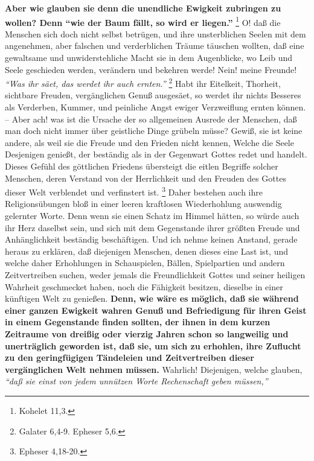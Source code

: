 \textbf{Aber wie glauben sie denn die unendliche Ewigkeit zubringen zu wollen? Denn
"`wie der Baum fällt, so wird er liegen."'}
\footnote{Kohelet 11,3. }
O! daß die Menschen sich doch nicht selbst
betrügen, und ihre unsterblichen Seelen mit dem angenehmen, aber falschen und
verderblichen Träume täuschen wollten, daß eine gewaltsame und unwiderstehliche
Macht sie in dem Augenblicke, wo Leib und Seele geschieden werden, verändern und
bekehren werde! Nein! meine Freunde!
\textit{"`Was ihr säet, das werdet ihr auch ernten."'}
\footnote{Galater 6,4-9. Epheser 5,6.}
Habt ihr Eitelkeit, Thorheit,
sichtbare Freuden, vergänglichen Genuß ausgesäet, so werdet ihr nichts Besseres
als Verderben, Kummer, und peinliche Angst ewiger Verzweiflung ernten können. --
Aber ach! was ist die Ursache der so allgemeinen Ausrede der Menschen, daß man
doch nicht immer über geistliche Dinge grübeln müsse? Gewiß, sie ist keine
andere, als weil sie die Freude und den Frieden nicht kennen, Welche die Seele
Desjenigen genießt, der beständig als in der Gegenwart Gottes redet und handelt.
Dieses Gefühl des göttlichen Friedens übersteigt die eitlen Begriffe solcher
Menschen, deren Verstand von der Herrlichkeit und den Freuden des Gottes dieser
Welt verblendet und verfinstert ist.
\footnote{Epheser 4,18-20.}
Daher bestehen
auch ihre Religionsübungen bloß in einer leeren kraftlosen Wiederhohlung
auswendig gelernter Worte. Denn wenn sie einen Schatz im Himmel hätten, so würde
auch ihr Herz daselbst sein, und sich mit dem Gegenstande ihrer größten Freude
und Anhänglichkeit beständig beschäftigen. Und ich nehme keinen Anstand, gerade
heraus zu erklären, daß diejenigen Menschen, denen dieses eine Last ist, und
welche daher Erhohlungen in Schauspielen, Bällen, Spielpartien und andern
Zeitvertreiben suchen, weder jemals die Freundlichkeit Gottes und seiner
heiligen Wahrheit geschmecket haben, noch die Fähigkeit besitzen, dieselbe in
einer künftigen Welt zu genießen. \textbf{Denn, wie wäre es möglich, daß sie während
einer ganzen Ewigkeit wahren Genuß und Befriedigung für ihren Geist in einem
Gegenstande finden sollten, der ihnen in dem kurzen Zeitraume von dreißig oder
vierzig Jahren schon so langweilig und unerträglich geworden ist, daß sie, um
sich zu erhohlen, ihre Zuflucht zu den geringfügigen Tändeleien und
Zeitvertreiben dieser vergänglichen Welt nehmen müssen.} Wahrlich! Diejenigen,
welche glauben,
\textit{"`daß sie einst von jedem unnützen Worte Rechenschaft geben
müssen,"'}
